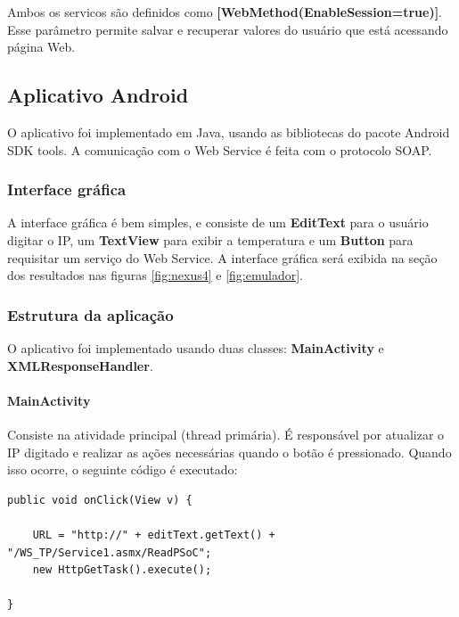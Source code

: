\documentclass[a4paper,12pt,titlepage]{article}
\begin{document}
		  Ambos os servicos são definidos como \textbf{[WebMethod(EnableSession=true)]}. Esse parâmetro permite salvar e recuperar valores do usuário que está acessando página Web. 
	
	\subsection{Aplicativo Android}	
			O aplicativo foi implementado em Java, usando as bibliotecas do pacote Android SDK tools. A comunicação com o Web Service é feita com o protocolo SOAP.
			
			\subsubsection{Interface gráfica}
				A interface gráfica é bem simples, e consiste de um \textbf{EditText} \cite{EditText} para o usuário digitar o IP, um \textbf{TextView} \cite{TextView} para exibir a temperatura e um \textbf{Button} \cite{Button} para requisitar um serviço do Web Service. A interface gráfica será exibida na seção dos resultados nas figuras \ref{fig:nexus4} e \ref{fig:emulador}.
				
			\subsubsection{Estrutura da aplicação}
			O aplicativo foi implementado usando duas classes: \textbf{MainActivity} e \textbf{XMLResponseHandler}. 
			\paragraph{MainActivity} Consiste na atividade principal (thread primária). É responsável por atualizar o IP digitado e realizar as ações necessárias quando o botão é pressionado. Quando isso ocorre, o seguinte código é executado:
			\begin{lstlisting}
public void onClick(View v) {
			
	URL = "http://" + editText.getText() + "/WS_TP/Service1.asmx/ReadPSoC";
	new HttpGetTask().execute();
			
}
			\end{lstlisting}		
			
\end{document}
